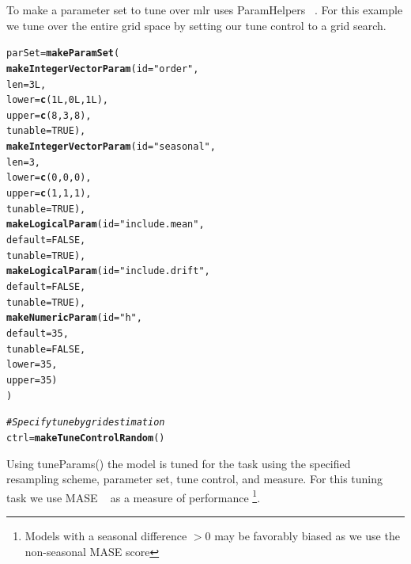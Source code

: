 \documentclass{article}\usepackage[]{graphicx}\usepackage[]{color}
\makeatletter
\newcommand{\hlnum}[1]{\textcolor[rgb]{0.686,0.059,0.569}{#1}}%
\newcommand{\hlstr}[1]{\textcolor[rgb]{0.192,0.494,0.8}{#1}}%
\newcommand{\hlcom}[1]{\textcolor[rgb]{0.678,0.584,0.686}{\textit{#1}}}%
\newcommand{\hlstd}[1]{\textcolor[rgb]{0.345,0.345,0.345}{#1}}%
\newcommand{\hlkwb}[1]{\textcolor[rgb]{0.69,0.353,0.396}{#1}}%
\newcommand{\hlkwc}[1]{\textcolor[rgb]{0.333,0.667,0.333}{#1}}%
\newcommand{\hlkwd}[1]{\textcolor[rgb]{0.737,0.353,0.396}{\textbf{#1}}}%
\newenvironment{kframe}{%
 \def\at@end@of@kframe{}%
 \ifinner\ifhmode%
  \def\at@end@of@kframe{\end{minipage}}%
  \begin{minipage}{\columnwidth}%
 \fi\fi%
 \def\FrameCommand##1{\hskip\@totalleftmargin \hskip-\fboxsep
 \colorbox{shadecolor}{##1}\hskip-\fboxsep
     \hskip-\linewidth \hskip-\@totalleftmargin \hskip\columnwidth}%
 \MakeFramed {\advance\hsize-\width
   \@totalleftmargin\z@ \linewidth\hsize
   \@setminipage}}%
 {\par\unskip\endMakeFramed%
 \at@end@of@kframe}
\newenvironment{knitrout}{}{} %
\theoremstyle{definition}
\newcommand\code{\@codex}
\def\@codex#1{{\normalfont\ttfamily\hyphenchar\font=-1 #1}}
\newcommand{\pkg}[1]{{\fontseries{b}\selectfont #1}}
\makeatother
\begin{document}
To make a parameter set to tune over \pkg{mlr} uses \pkg{ParamHelpers} ~\cite{paramhelper}. For this example we tune over the entire grid space by setting our tune control to a grid search. 
\begin{knitrout}
\color{fgcolor}\begin{kframe}
\begin{alltt}
\hlstd{parSet} \hlkwb{=} \hlkwd{makeParamSet}\hlstd{(}
  \hlkwd{makeIntegerVectorParam}\hlstd{(}\hlkwc{id} \hlstd{=} \hlstr{"order"}\hlstd{,}
                         \hlkwc{len} \hlstd{=} \hlnum{3L}\hlstd{,}
                         \hlkwc{lower} \hlstd{=} \hlkwd{c}\hlstd{(}\hlnum{1L}\hlstd{,}\hlnum{0L}\hlstd{,}\hlnum{1L}\hlstd{),}
                         \hlkwc{upper} \hlstd{=} \hlkwd{c}\hlstd{(}\hlnum{8}\hlstd{,}\hlnum{3}\hlstd{,}\hlnum{8}\hlstd{),}
                         \hlkwc{tunable} \hlstd{=} \hlnum{TRUE}\hlstd{),}
  \hlkwd{makeIntegerVectorParam}\hlstd{(}\hlkwc{id} \hlstd{=} \hlstr{"seasonal"}\hlstd{,}
                         \hlkwc{len} \hlstd{=} \hlnum{3}\hlstd{,}
                         \hlkwc{lower} \hlstd{=} \hlkwd{c}\hlstd{(}\hlnum{0}\hlstd{,}\hlnum{0}\hlstd{,}\hlnum{0}\hlstd{),}
                         \hlkwc{upper} \hlstd{=} \hlkwd{c}\hlstd{(}\hlnum{1}\hlstd{,}\hlnum{1}\hlstd{,}\hlnum{1}\hlstd{),}
                         \hlkwc{tunable} \hlstd{=} \hlnum{TRUE}\hlstd{),}
  \hlkwd{makeLogicalParam}\hlstd{(}\hlkwc{id} \hlstd{=} \hlstr{"include.mean"}\hlstd{,}
                   \hlkwc{default} \hlstd{=} \hlnum{FALSE}\hlstd{,}
                   \hlkwc{tunable} \hlstd{=} \hlnum{TRUE}\hlstd{),}
  \hlkwd{makeLogicalParam}\hlstd{(}\hlkwc{id} \hlstd{=} \hlstr{"include.drift"}\hlstd{,}
                   \hlkwc{default} \hlstd{=} \hlnum{FALSE}\hlstd{,}
                   \hlkwc{tunable} \hlstd{=} \hlnum{TRUE}\hlstd{),}
  \hlkwd{makeNumericParam}\hlstd{(}\hlkwc{id} \hlstd{=} \hlstr{"h"}\hlstd{,}
                   \hlkwc{default} \hlstd{=} \hlnum{35}\hlstd{,}
                   \hlkwc{tunable} \hlstd{=} \hlnum{FALSE}\hlstd{,}
                   \hlkwc{lower} \hlstd{=} \hlnum{35}\hlstd{,}
                   \hlkwc{upper} \hlstd{=} \hlnum{35}\hlstd{)}
\hlstd{)}

\hlcom{#Specify tune by grid estimation}
\hlstd{ctrl} \hlkwb{=} \hlkwd{makeTuneControlRandom}\hlstd{()}
\end{alltt}
\end{kframe}
\end{knitrout}

Using \code{tuneParams()} the model is tuned for the task using the specified resampling scheme, parameter set, tune control, and measure. For this tuning task we use MASE ~\cite{Hyndman2006} as a measure of performance \footnote{Models with a seasonal difference $> 0$ may be favorably biased as we use the non-seasonal MASE score}.
\end{document}
